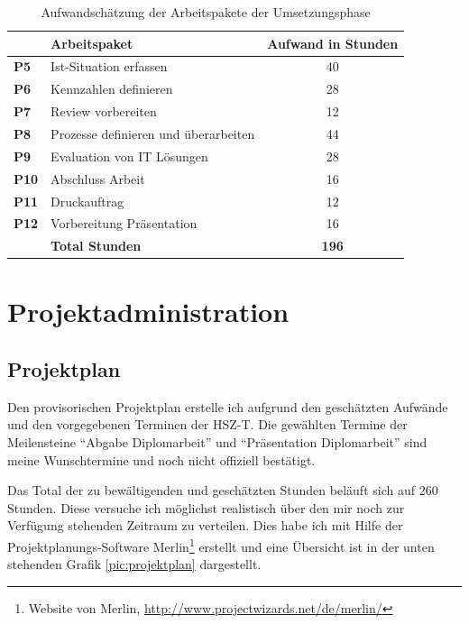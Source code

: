 \begin{table}[htbp]
\begin{center}
    \begin{tabular}{llc}
        \toprule & \textbf{Arbeitspaket} & \textbf{Aufwand in Stunden} \\
        \midrule \textbf{P5} & Ist-Situation erfassen & 40 \\
        \midrule \textbf{P6} & Kennzahlen definieren & 28 \\
        \midrule \textbf{P7} & Review vorbereiten & 12 \\
        \midrule \textbf{P8} & Prozesse definieren und überarbeiten & 44 \\
        \midrule \textbf{P9} & Evaluation von IT Lösungen & 28 \\
        \midrule \textbf{P10} & Abschluss Arbeit & 16 \\
        \midrule \textbf{P11} & Druckauftrag & 12 \\
        \midrule \textbf{P12} & Vorbereitung Präsentation & 16 \\
        \bottomrule & \textbf{Total Stunden} & \textbf{196} \\
        \bottomrule
    \end{tabular}
    \caption{Aufwandschätzung der Arbeitspakete der Umsetzungsphase}
    \label{tab:aufwand_umsetzungsphase}
\end{center}
\end{table}

\chapter{Projektadministration}
\section{Projektplan}
Den provisorischen Projektplan erstelle ich aufgrund den geschätzten Aufwände
und den vorgegebenen Terminen der HSZ-T. Die gewählten Termine der Meilensteine
``Abgabe Diplomarbeit'' und ``Präsentation Diplomarbeit'' sind meine Wunschtermine
und noch nicht offiziell bestätigt.

Das Total der zu bewältigenden und geschätzten Stunden beläuft sich 
auf 260 Stunden. Diese versuche ich möglichst realistisch über den mir noch
zur Verfügung stehenden Zeitraum zu verteilen. Dies habe ich mit Hilfe der 
Projektplanungs-Software Merlin\footnote{Website von Merlin, \url{http://www.projectwizards.net/de/merlin/}} 
erstellt und eine Übersicht ist in der unten stehenden Grafik \ref{pic:projektplan} 
dargestellt.

